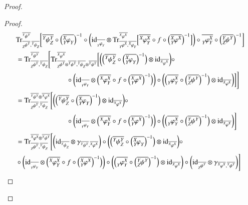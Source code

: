 \documentclass{amsart}
\def\tn{\textnormal}
\def\Trace{\tn{Tr}}
\def\ol{\overline}
\def\id{\tn{id}}
\newcommand{\feeddd}[3]{{\tensor*[^{#2}_{\color{white}{!}}]{{#1}}{^{#3}}}}%
\newcommand{\feeddc}[3]{{\tensor*[^{#2}]{{#1}}{_{#3}}}}
\newcommand{\feedcd}[3]{{\tensor*[_{#2}]{{#1}}{^{#3}}}}
\newcommand{\feedcc}[3]{{\tensor*[^{\color{white}{!}}_{#2}]{{#1}}{_{#3}}}}
\newcommand{\feedda}[3]{{\tensor*[^{#2}_{\color{white}{!}}]{{#1}}{^{#2}_{#3}}}}
\newcommand{\feedca}[3]{{\tensor*[_{#2}]{{#1}}{_{#2}^{#3}}}}
\newcommand{\feedad}[3]{{\tensor*[^{#2}_{#3}]{{#1}}{^{#2}}}}
\newcommand{\feedac}[3]{{\tensor*[_{#2}^{#3}]{{#1}}{_{#2}}}}
\theoremstyle{remark}
\theoremstyle{definition}
\begin{document}
\begin{proof}
\begin{proof}
\begin{align*}
&\Trace^{\ol{\feeddd{\psi}{Y}{Y}}}_{\ol{\feedcd{\psi}{Z}{Y}},\ol{\feeddc{\psi}{Y}{Z}}}
\bigg[\ol{\feedda{\psi}{Y}{Z}}\circ\Big(\ol{\feedac{\varphi}{Y}{X}}\Big)^{-1}\circ\bigg(\id_{\ol{\feedcc{\varphi}{Y}{Y}}}\otimes \Trace^{\ol{\feeddd{\varphi}{X}{X}}}_{\ol{\feedcd{\varphi}{Y}{X}},\ol{\feeddc{\varphi}{X}{Y}}}\Big[\ol{\feedda{\varphi}{X}{Y}}\circ f\circ\Big(\ol{\feedad{\varphi}{X}{Y}}\Big)^{-1}\Big]\bigg)\circ\ol{\feedca{\varphi}{Y}{X}}\circ\Big(\ol{\feedad{\psi}{Y}{Z}}\Big)^{-1}\bigg]\\
&=\Trace^{\ol{\feeddd{\psi}{Y}{Y}}}_{\ol{\feedcd{\psi}{Z}{Y}},\ol{\feeddc{\psi}{Y}{Z}}}
\Bigg[\Trace^{\ol{\feeddd{\varphi}{X}{X}}}_{\ol{\feedcd{\psi}{Z}{Y}}\otimes\ol{\feeddd{\psi}{Y}{Y}},\ol{\feeddc{\psi}{Y}{Z}}\otimes\ol{\feeddd{\psi}{Y}{Y}}}\bigg[\bigg(\Big(\ol{\feedda{\psi}{Y}{Z}}\circ\Big(\ol{\feedac{\varphi}{Y}{X}}\Big)^{-1}\Big)\otimes\id_{\ol{\feeddd{\varphi}{X}{X}}}\bigg)\circ\\
&\hspace{1in}\circ\bigg(\id_{\ol{\feedcc{\varphi}{Y}{Y}}}\otimes\Big(\ol{\feedda{\varphi}{X}{Y}}\circ f\circ\Big(\ol{\feedad{\varphi}{X}{Y}}\Big)^{-1}\Big)\bigg)\circ\bigg(\Big(\ol{\feedca{\varphi}{Y}{X}}\circ\Big(\ol{\feedad{\psi}{Y}{Z}}\Big)^{-1}\Big)\otimes\id_{\ol{\feeddd{\varphi}{X}{X}}}\bigg)\bigg]\Bigg]\\
&=\Trace^{\ol{\feeddd{\psi}{Y}{Y}}\otimes\ol{\feeddd{\varphi}{X}{X}}}_{\ol{\feedcd{\psi}{Z}{Y}},\ol{\feeddc{\psi}{Y}{Z}}}\Bigg[
\bigg(\Big(\ol{\feedda{\psi}{Y}{Z}}\circ\Big(\ol{\feedac{\varphi}{Y}{X}}\Big)^{-1}\Big)\otimes\id_{\ol{\feeddd{\varphi}{X}{X}}}\bigg)\circ\\
&\hspace{1in}\circ\bigg(\id_{\ol{\feedcc{\varphi}{Y}{Y}}}\otimes\Big(\ol{\feedda{\varphi}{X}{Y}}\circ f\circ\Big(\ol{\feedad{\varphi}{X}{Y}}\Big)^{-1}\Big)\bigg)\circ\bigg(\Big(\ol{\feedca{\varphi}{Y}{X}}\circ\Big(\ol{\feedad{\psi}{Y}{Z}}\Big)^{-1}\Big)\otimes\id_{\ol{\feeddd{\varphi}{X}{X}}}\bigg)\Bigg]\\
&=\Trace^{\ol{\feeddd{\varphi}{X}{X}}\otimes\ol{\feeddd{\psi}{Y}{Y}}}_{\ol{\feedcd{\psi}{Z}{Y}},\ol{\feeddc{\psi}{Y}{Z}}}\Bigg[
\bigg(\id_{\ol{\feeddc{\psi}{Y}{Z}}}\otimes\gamma_{\ol{\feeddd{\psi}{Y}{Y}},\ol{\feeddd{\varphi}{X}{X}}}\bigg)\circ\bigg(\Big(\ol{\feedda{\psi}{Y}{Z}}\circ\Big(\ol{\feedac{\varphi}{Y}{X}}\Big)^{-1}\Big)\otimes\id_{\ol{\feeddd{\varphi}{X}{X}}}\bigg)\circ\\
&\circ\bigg(\id_{\ol{\feedcc{\varphi}{Y}{Y}}}\otimes\Big(\ol{\feedda{\varphi}{X}{Y}}\circ f\circ\Big(\ol{\feedad{\varphi}{X}{Y}}\Big)^{-1}\Big)\bigg)\circ\bigg(\Big(\ol{\feedca{\varphi}{Y}{X}}\circ\Big(\ol{\feedad{\psi}{Y}{Z}}\Big)^{-1}\Big)\otimes\id_{\ol{\feeddd{\varphi}{X}{X}}}\bigg)\circ\bigg(\id_{\ol{\feedcd{\psi}{Z}{Y}}}\otimes\gamma_{\ol{\feeddd{\varphi}{X}{X}},\ol{\feeddd{\psi}{Y}{Y}}}\bigg)\Bigg]\\

\end{align*}
\end{proof}
\end{proof}
\end{document}
